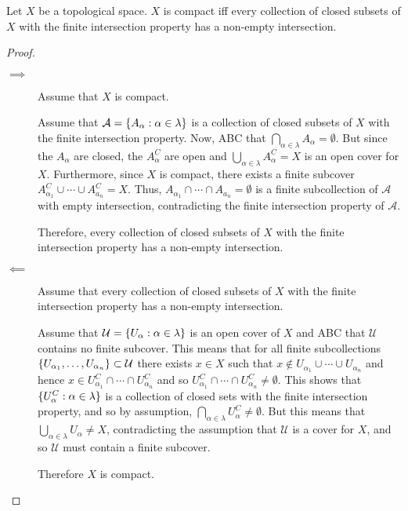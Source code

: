 \documentclass[letterpaper,12pt,fleqn]{article}
\newcommand{\U}{\mathcal{U}}
\renewcommand{\a}{\alpha}
\renewcommand{\l}{\lambda}
\newcommand{\A}{\mathcal{A}}
\begin{document}
\begin{theorem}[6.5]
  Let \(X\) be a topological space.  \(X\) is compact iff every collection of closed subsets of \(X\) with the
  finite intersection property has a non-empty intersection.
\end{theorem}

\begin{proof}
  \begin{description}
  \item[]
  \item[\(\implies\)] Assume that \(X\) is compact.

    Assume that \(\A=\set{A_{\a}:\a\in\l}\) is a collection of closed subsets of \(X\) with the finite intersection
    property.  Now, ABC that \(\bigcap_{\a\in\l}A_{\a}=\emptyset\).  But since the \(A_{\a}\) are closed, the
    \(A_{\a}^C\) are open and \(\bigcup_{\a\in\l}A_{\a}^C=X\) is an open cover for \(X\).  Furthermore, since \(X\)
    is compact, there exists a finite subcover \(A_{\a_1}^C\cup\cdots\cup A_{a_n}^C=X\).  Thus,
    \(A_{\a_1}\cap\cdots\cap A_{a_n}=\emptyset\) is a finite subcollection of \(\A\) with empty intersection,
    contradicting the finite intersection property of \(\A\).

    Therefore, every collection of closed subsets of \(X\) with the finite intersection property has a non-empty
    intersection.

  \item[\(\impliedby\)] Assume that every collection of closed subsets of \(X\) with the finite intersection property
    has a non-empty intersection.

    Assume that \(\U=\set{U_{\a}:\a\in\l}\) is an open cover of \(X\) and ABC that \(\U\) contains no finite
    subcover.  This means that for all finite subcollections \(\set{U_{\a_1},\ldots,U_{\a_n}}\subset\U\) there
    exists \(x\in X\) such that \(x\notin U_{\a_1}\cup\cdots\cup U_{\a_n}\) and hence
    \(x\in U_{\a_1}^C\cap\cdots\cap U_{\a_n}^C\) and so \(U_{\a_1}^C\cap\cdots\cap U_{\a_n}^C\ne\emptyset\).  This shows
    that \(\set{U_{\a}^C:\a\in\l}\) is a collection of closed sets with the finite intersection property, and so by
    assumption, \(\bigcap_{\a\in\l}U_{\a}^C\ne\emptyset\).  But this means that \(\bigcup_{\a\in\l}U_{\a}\ne X\),
    contradicting the assumption that \(\U\) is a cover for \(X\), and so \(\U\) must contain a finite subcover.

    Therefore \(X\) is compact.
  \end{description}
\end{proof}
\end{document}

